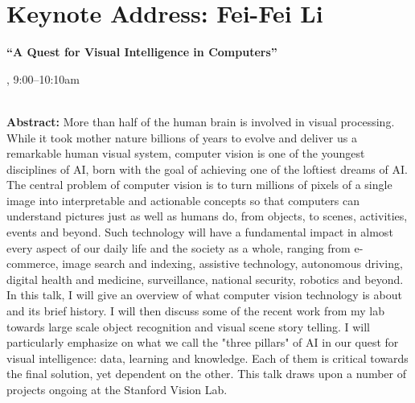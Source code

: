 \section{Keynote Address: Fei-Fei Li}

\begin{center}
\begin{Large}
{\bfseries\Large ``A Quest for Visual Intelligence in Computers''}
\vspace{1em}\par
\end{Large}

\daydateyear, 9:00--10:10am \vspace{1em}\\
\PlenaryLoc \\
\vspace{1em}\par
\end{center}

\noindent
{\bfseries Abstract:} More than half of the human brain is involved in
visual processing. While it took mother nature billions of years to
evolve and deliver us a remarkable human visual system, computer
vision is one of the youngest disciplines of AI, born with the goal of
achieving one of the loftiest dreams of AI. The central problem of
computer vision is to turn millions of pixels of a single image into
interpretable and actionable concepts so that computers can understand
pictures just as well as humans do, from objects, to scenes,
activities, events and beyond. Such technology will have a fundamental
impact in almost every aspect of our daily life and the society as a
whole, ranging from e-commerce, image search and indexing, assistive
technology, autonomous driving, digital health and medicine,
surveillance, national security, robotics and beyond. In this talk, I
will give an overview of what computer vision technology is about and
its brief history. I will then discuss some of the recent work from my
lab towards large scale object recognition and visual scene story
telling. I will particularly emphasize on what we call the "three
pillars" of AI in our quest for visual intelligence: data, learning
and knowledge. Each of them is critical towards the final solution,
yet dependent on the other. This talk draws upon a number of projects
ongoing at the Stanford Vision Lab. 

\vspace{3em}\par 

